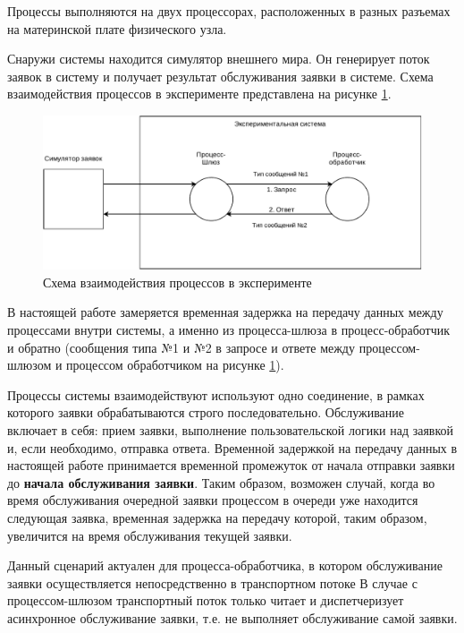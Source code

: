 Процессы выполняются на двух процессорах, расположенных в разных разъемах на материнской плате физического узла.

Снаружи системы находится симулятор внешнего мира. Он генерирует поток заявок в систему и получает результат обслуживания заявки в системе. Схема взаимодействия процессов в эксперименте представлена на рисунке \ref{chapter41:SystemSchema}.

\begin{figure}[!h]
\caption{Схема взаимодействия процессов в эксперименте}
\label{chapter41:SystemSchema}
\includegraphics[width=\textwidth]{../../graphics/schemes/SystemSchema}
\end{figure}

В настоящей работе замеряется временная задержка на передачу данных между процессами внутри системы, а именно из процесса-шлюза в процесс-обработчик и обратно (сообщения типа №1 и №2 в запросе и ответе между процессом-шлюзом и процессом обработчиком на рисунке \ref{chapter41:SystemSchema}).

Процессы системы взаимодействуют используют одно соединение, в рамках которого заявки обрабатываются строго последовательно.
Обслуживание включает в себя: прием заявки, выполнение пользовательской логики над заявкой и, если необходимо, отправка ответа.
Временной задержкой на передачу данных в настоящей работе принимается временной промежуток от начала отправки заявки до \textbf{начала обслуживания заявки}. Таким образом, возможен случай, когда во время обслуживания очередной заявки процессом в очереди уже находится следующая заявка, временная задержка на передачу которой, таким образом, увеличится на время обслуживания текущей заявки.

Данный сценарий актуален для процесса-обработчика, в котором обслуживание заявки осуществляется непосредственно в транспортном потоке
В случае с процессом-шлюзом транспортный поток только читает и диспетчеризует асинхронное обслуживание заявки, т.е. не выполняет обслуживание самой заявки.

